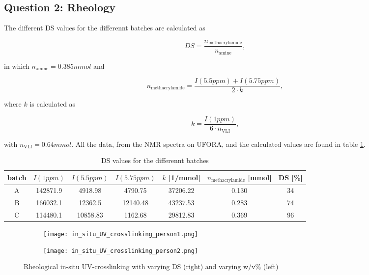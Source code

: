 \subsection{Question 2: Rheology}

The different DS values for the differennt batches are calculated as

\begin{equation}
    DS = \frac{n_{\text{methacrylamide}}}{n_{\text{amine}}},
    \label{eq:DS}
\end{equation}

in which $n_{\text{amine}} = 0.385\unit{mmol}$ and

\begin{equation}
    n_{\text{methacrylamide}} = \frac{I(5.5\unit{ppm})+I(5.75\unit{ppm})}{2\cdot k},
    \label{eq:nMA}
\end{equation}

where $k$ is calculated as

\begin{equation}
    k = \frac{I(1\unit{ppm})}{6\cdot n_{\text{VLI}}},
    \label{eq:j}
\end{equation}

with $n_{\text{VLI}}=0.64\unit{mmol}$. All the data, from the NMR spectra on UFORA, and the calculated values are found in table \ref{tab:researcher1}.

\begin{table}[H]
    \centering
    \begin{tabular}{ccccccc}
      batch & $I(1\unit{ppm})$ & $I(5.5\unit{ppm})$ & $I(5.75\unit{ppm})$ & $k$ [1/mmol]& $n_{\text{methacrylamide}}$ [mmol] & DS [\%]\\
      \hline
      A & 142871.9 & 4918.98 & 4790.75 & 37206.22 & 0.130 & 34\\
      B & 166032.1 & 12362.5 & 12140.48 & 43237.53 & 0.283 & 74\\
      C & 114480.1 & 10858.83 & 1162.68 & 29812.83 & 0.369 & 96\\
    \end{tabular}
    \caption{DS values for the differennt batches}
    \label{tab:researcher1}
\end{table}

\begin{figure}[H]
    \centering
    \begin{subfigure}[b]{0.45\textwidth}
    \centering
    \texttt{[image: in\_situ\_UV\_crosslinking\_person1.png]}
    \end{subfigure}
    \begin{subfigure}[b]{0.45\textwidth}
    \centering
    \texttt{[image: in\_situ\_UV\_crosslinking\_person2.png]}
    \end{subfigure}
    \caption{Rheological in-situ UV-crosslinking with varying DS (right) and varying w/v\% (left)}
    \label{fig:rheo}
\end{figure}

